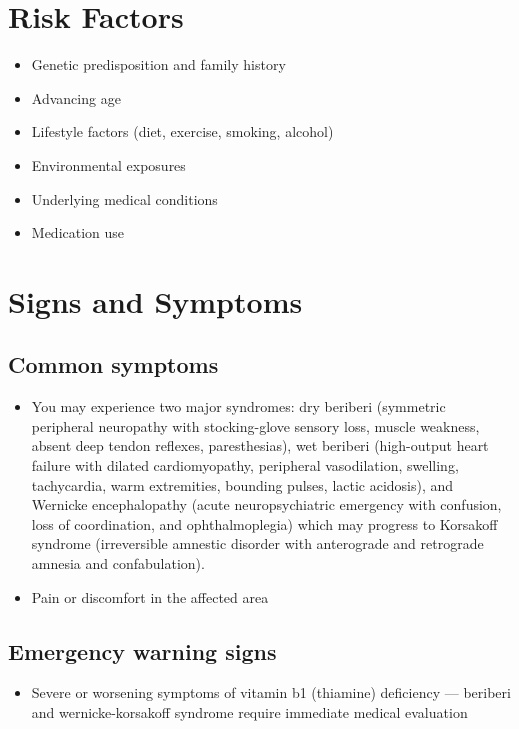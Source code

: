\section{Risk Factors}


\begin{itemize}[noitemsep]
  \item Genetic predisposition and family history
  \item Advancing age
  \item Lifestyle factors (diet, exercise, smoking, alcohol)
  \item Environmental exposures
  \item Underlying medical conditions
  \item Medication use
\end{itemize}
\section{Signs and Symptoms}

\subsection{Common symptoms}
\begin{itemize}[noitemsep]
  \item You may experience two major syndromes: dry beriberi (symmetric peripheral neuropathy with stocking-glove sensory loss, muscle weakness, absent deep tendon reflexes, paresthesias), wet beriberi (high-output heart failure with dilated cardiomyopathy, peripheral vasodilation, swelling, tachycardia, warm extremities, bounding pulses, lactic acidosis), and Wernicke encephalopathy (acute neuropsychiatric emergency with confusion, loss of coordination, and ophthalmoplegia) which may progress to Korsakoff syndrome (irreversible amnestic disorder with anterograde and retrograde amnesia and confabulation).
  \item Pain or discomfort in the affected area
  \end{itemize}

\subsection{Emergency warning signs}
\begin{itemize}[noitemsep]
  \item Severe or worsening symptoms of vitamin b1 (thiamine) deficiency --- beriberi and wernicke-korsakoff syndrome require immediate medical evaluation
\end{itemize}
